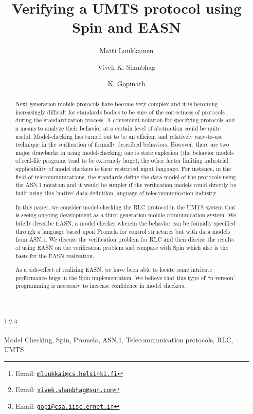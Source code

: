 \documentclass{entcs} \usepackage{entcsmacro}
\begin{document}
\begin{frontmatter}
  \title{Verifying a UMTS protocol using Spin and EASN}
  \author{Matti Luukkainen}
  \address{University of Helsinki, Department of Computer Science
	P.O.Box 26, 00014 University of Helsinki, Finland}
  \author{Vivek K. Shanbhag}
  \address{Sun Microsystems, Divyasree Chambers, Bangalore 560025}
  \author{K. Gopinath}
  \address{CSA Dept, Indian Institute of Science, Bangalore 560012}
  \thanks[mattiEmail]{Email: \href{mailto:mluukkai@cs.helsinki.fi}
    {\texttt{\normalshape mluukkai@cs.helsinki.fi}}}
  \thanks[vivekEmail]{Email: \href{mailto:vivek.shanbhag@sun.com}
    {\texttt{\normalshape vivek.shanbhag@sun.com}}}
  \thanks[gopiEmail]{Email: \href{mailto:gopi@csa.iisc.ernet.in}
    {\texttt{\normalshape gopi@csa.iisc.ernet.in}}}

\begin{abstract} 
Next generation mobile protocols have become very complex and it is
becoming increasingly difficult for standards bodies to be sure of the
correctness of protocols during the standardization process.  A
convenient notation for specifying protocols and a means to analyze
their behavior at a certain level of abstraction could be quite
useful. Model-checking has turned out to be an efficient and
relatively easy-to-use technique in the verification of formally
described behaviors. However, there are two major drawbacks in using
model-checking: one is state explosion (the behavior models of
real-life programs tend to be extremely large); the other factor
limiting industrial applicability of model checkers is their
restricted input language. For instance, in the field of
telecommunications, the standards define the data model of the
protocols using the ASN.1 notation and it would be simpler if the
verification models could directly be built using this 'native' data
definition language of telecommunication industry.

In this paper, we consider model checking the RLC protocol in the UMTS
system that is seeing ongoing development as a third generation
mobile communication system. We briefly describe EASN, a model
checker wherein the behavior can be formally specified through a
language based upon Promela for control structures but with data
models from ASN.1. We discuss the verification problem for RLC and
then discuss the results of using EASN on the verification problem and
compare with Spin which also is the basis for the EASN
realization. 

As a side-effect of realizing EASN, we have been able to locate some
intricate performance bugs in the Spin implementation. We believe that
this type of ``n-version'' programming is necessary to increase
confidence in model checkers.

\end{abstract}

\begin{keyword}
Model Checking, Spin, Promela, ASN.1, Telecommunication protocols, RLC, UMTS
\end{keyword}

\end{frontmatter}
\end{document}
